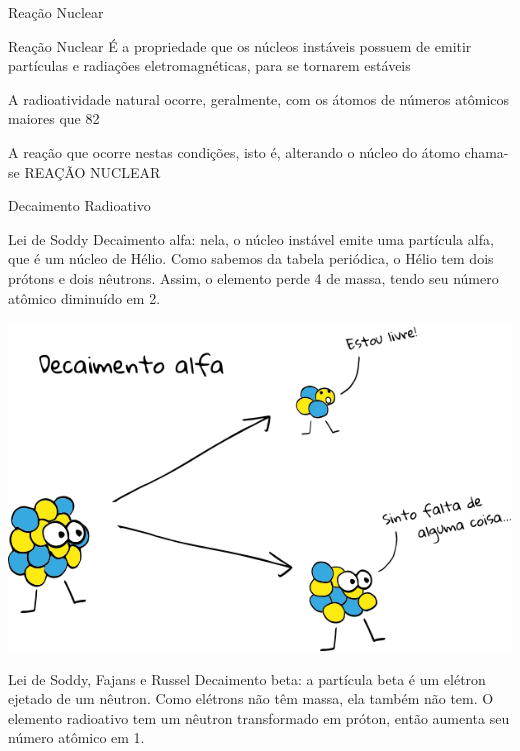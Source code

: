 \documentclass[presentation]{beamer}
\begin{document}
\begin{frame}[label={sec:org080017c}]{Reação Nuclear}
\begin{block}{Reação Nuclear}
É a propriedade que os núcleos instáveis possuem de emitir partículas e radiações eletromagnéticas, para se tornarem estáveis


A radioatividade natural ocorre, geralmente, com os átomos de números atômicos maiores que 82


A reação que ocorre nestas condições, isto é, alterando o núcleo do átomo chama-se \alert{REAÇÃO NUCLEAR}
\end{block}
\end{frame}


\begin{frame}[label={sec:org4501f1e}]{Decaimento Radioativo}
\begin{block}{Lei de Soddy}
\alert{Decaimento alfa:} nela, o núcleo instável emite uma partícula alfa, que é um núcleo de Hélio. Como sabemos da tabela periódica, o Hélio tem dois prótons e dois nêutrons. Assim, o elemento perde 4 de massa, tendo seu número atômico diminuído em 2.

\begin{center}
\end{center}

\begin{center}
\includegraphics[scale=0.2]{./alfa.png}
\end{center}
\end{block}

\begin{block}{Lei de Soddy, Fajans e Russel}
\alert{Decaimento beta:} a partícula beta é um elétron ejetado de um nêutron. Como elétrons não têm massa, ela também não tem. O elemento radioativo tem um nêutron transformado em próton, então aumenta seu número atômico em 1.


\end{block}
\end{frame}
\end{document}
